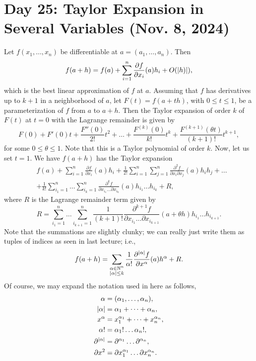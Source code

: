 \section{Day 25: Taylor Expansion in Several Variables (Nov. 8, 2024)}
Let $f(x_1, \dots, x_n)$ be differentiable at $a = (a_1, \dots, a_n)$. Then
\[ f(a + h) = f(a) + \sum_{i=1}^n \frac{\partial f}{\partial x_i}(a) h_i + O(\left\lvert h) \right\rvert), \]
which is the best linear approximation of $f$ at $a$. Assuming that $f$ has derivatives up to $k + 1$ in a neighborhood of $a$, let $F(t) = f(a + th)$, with $0 \leq t \leq 1$, be a parameterization of $f$ from $a$ to $a+h$. Then the Taylor expansion of order $k$ of $F(t)$ at $t = 0$ with the Lagrange remainder is given by
\[ F(0) + F'(0)t + \frac{F''(0)}{2!}t^2 + \dots + \frac{F^{(k)}(0)}{k!} t^k + \frac{F^{(k+1)}(\theta t)}{(k+1)!} t^{k+1}, \]
for some $0 \leq \theta \leq 1$. Note that this is a Taylor polynomial of order $k$. Now, let us set $t = 1$. We have $f(a + h)$ has the Taylor expansion
\begin{align*}
    & f(a) + \sum_{i=1}^n \frac{\partial f}{\partial x_i}(a) h_i + \frac{1}{2!} \sum_{i=1}^n \sum_{j=1}^n \frac{\partial^2 f}{\partial x_i \partial x_j} (a) h_i h_j + \dots \\
    & + \frac{1}{k!} \sum_{i_1 = 1}^n \dots \sum_{i_k = 1}^n \frac{\partial^k f}{\partial x_{i_1} \dots \partial x_{i_k}} (a) h_{i_1} \dots h_{i_k} + R,
\end{align*}
where $R$ is the Lagrange remainder term given by 
\[ R = \sum_{i_1 = 1}^n \dots \sum_{i_{k+1} = 1}^n \frac{1}{(k+1)!} \frac{\partial^{k+1} f}{\partial x_{i_1} \dots \partial x_{i_{k+1}}} (a + \theta h) h_{i_1} \dots h_{i_{k+1}}. \]
Note that the summations are slightly clunky; we can really just write them as tuples of indices as seen in last lecture; i.e.,
\[ f(a + h) = \sum_{\substack{\alpha \in \mathbb N^n \\ \left\lvert \alpha \right\rvert \leq k}} \frac{1}{\alpha!} \frac{\partial^{\left\lvert \alpha \right\rvert} f}{\partial x^\alpha} (a) h^\alpha + R. \]
Of course, we may expand the notation used in here as follows,
\begin{align*}
    \alpha &= (\alpha_1, \dots, \alpha_n), \\
    \left\lvert \alpha \right\rvert &= \alpha_1 + \dots + \alpha_n, \\
    x^\alpha &= x_1^{\alpha_1} + \dots + x_n^{\alpha_n}, \\
    \alpha! &= \alpha_1! \dots \alpha_n!, \\
    \partial^{\left\lvert \alpha \right\rvert} &= \partial^{\alpha_1} \dots \partial^{\alpha_n}, \\
    \partial x^2 &= \partial x_1^{\alpha_1} \dots \partial x_n^{\alpha_n}.
\end{align*}
